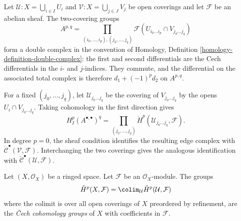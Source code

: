 \begin{remark}
\label{remark-FAC-two-covering-double-complex}
\begin{reference}
\cite[Chapter I, \S 4, no. 28, Proposition 2, pp. 220--221]{FAC}
\end{reference}
Let $\mathcal{U} : X = \bigcup_{i \in I} U_i$ and
$\mathcal{V} : X = \bigcup_{j \in J} V_j$ be open coverings and let
$\mathcal{F}$ be an abelian sheaf. The two-covering groups
$$
A^{p, q} =
\prod_{(i_0, \ldots, i_p), (j_0, \ldots, j_q)}
\mathcal{F}(U_{i_0 \ldots i_p} \cap V_{j_0 \ldots j_q})
$$
form a double complex in the convention of
Homology, Definition \ref{homology-definition-double-complex}:
the first and second differentials are the Cech differentials in the
$i$- and $j$-indices. They commute, and the differential on the associated
total complex is therefore $d_1 + (-1)^p d_2$ on $A^{p, q}$.

For a fixed $(j_0, \ldots, j_q)$, let
$\mathcal{U}_{j_0 \ldots j_q}$ be the covering of
$V_{j_0 \ldots j_q}$ by the opens
$U_i \cap V_{j_0 \ldots j_q}$. Taking cohomology in the first direction
gives
$$
H^p_I(A^{\bullet, \bullet})^q =
\prod_{(j_0, \ldots, j_q)}
\check{H}^p(\mathcal{U}_{j_0 \ldots j_q}, \mathcal{F}).
$$
In degree $p = 0$, the sheaf condition identifies the resulting edge
complex with $\check{\mathcal{C}}^\bullet(\mathcal{V}, \mathcal{F})$.
Interchanging the two coverings gives the analogous identification with
$\check{\mathcal{C}}^\bullet(\mathcal{U}, \mathcal{F})$.
\end{remark}

\begin{definition}
\label{definition-cech-cohomology-space}
\begin{reference}
\cite[Chapter I, \S 3, no. 22, Definition, p. 215]{FAC}
\end{reference}
Let $(X, \mathcal{O}_X)$ be a ringed space. Let $\mathcal{F}$ be an
$\mathcal{O}_X$-module. The groups
$$
\check{H}^p(X, \mathcal{F}) =
\colim_\mathcal{U} \check{H}^p(\mathcal{U}, \mathcal{F})
$$
where the colimit is over all open coverings of $X$ preordered by refinement,
are the {\it {\v C}ech cohomology groups} of $X$ with coefficients in
$\mathcal{F}$.
\end{definition}

